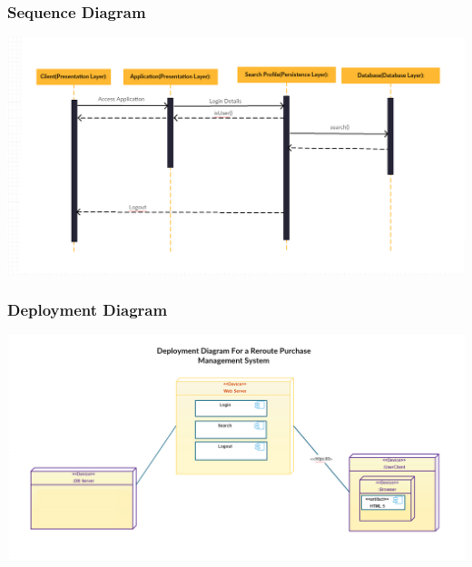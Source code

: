 \documentclass[a4paper,10pt]{article}
\begin{document}
	\subsubsection {Sequence Diagram}
		 \includegraphics[scale=0.57]{Diagrams/SequenceDiagram.png}\\
	
	\subsubsection {Deployment Diagram}
		 \includegraphics[scale=0.5]{Diagrams/DeploymentDiagram.png}\\
		
		
\end{document}
